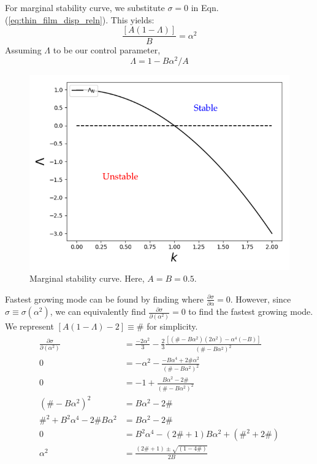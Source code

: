 \documentclass{article}
\newcommand{\pd}[2]{\frac{\partial{#1}}{\partial{#2}}}
\begin{document}
For marginal stability curve, we substitute $\sigma = 0$ in Eqn.(\ref{eq:thin_film_disp_reln}).
%
This yields:
\begin{equation}\label{eq:thin_film_marginal_stab}
 \frac{[A(1-\Lambda)]}{B} = \alpha^{2}
\end{equation}
Assuming $\Lambda$ to be our control parameter,
\begin{equation}
 \Lambda = 1 - B\alpha^{2}/A
\end{equation}
\begin{figure}[H]
    \centering
    \includegraphics[scale = 0.4]{Figs/thin_liq_films_deformable_substrate_marginal_stab.png}
    \caption{Marginal stability curve. Here, $A = B = 0.5$.}
    \label{fig:thin_liq_films_deformable_substrate_marginal_stab}
\end{figure}
Fastest growing mode can be found by finding where $\pd{\sigma}{\alpha} = 0$. However, since $\sigma \equiv \sigma (\alpha^{2})$, we can equivalently find $\pd{\sigma}{(\alpha^{2})} = 0$ to find the fastest growing mode. We represent $[A(1-\Lambda)-2] \equiv \# $ for simplicity. 
\begin{align}
 \begin{split}
  \pd{\sigma}{(\alpha^{2})} &= \frac{-2\alpha^{2}}{3} - \frac{2}{3}\frac{\left[ (\# - B\alpha^{2})(2\alpha^{2})- \alpha^{4}(-B)\right]}{(\# - B\alpha^{2})^{2}} \\
  0 & = -\alpha^{2} - \frac{-B\alpha^{4} + 2 \# \alpha^{2}}{(\# - B\alpha^{2})^{2}} \\
  0 & = -1 + \frac{B\alpha^{2} - 2\#}{(\# - B\alpha^{2})^{2}}\\
  (\# - B\alpha^{2})^{2} & = B\alpha^{2} - 2\# \\
  \#^{2} + B^{2}\alpha^{4} - 2\# B \alpha^{2} &= B\alpha^{2} - 2\# \\
  0 & = B^{2}\alpha^{4} - (2\# + 1) B \alpha^{2} +(\#^{2} + 2\#)\\
  \alpha^{2} &= \frac{(2\# + 1) \pm \sqrt{(1- 4 \#)} }{2B}\\
  \end{split}
\end{align}
\end{document}
